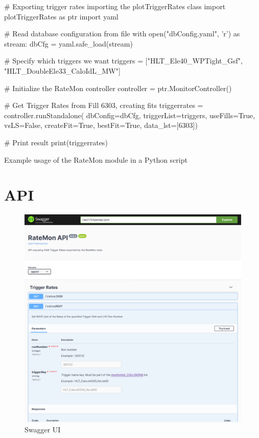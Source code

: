 \begin{listing}[ht]
\begin{pythoncode}
# Exporting trigger rates importing the plotTriggerRates class
import plotTriggerRates as ptr
import yaml

# Read database configuration from file
with open("dbConfig.yaml", 'r') as stream:
    dbCfg = yaml.safe_load(stream)

# Specify which triggers we want
triggers = ["HLT_Ele40_WPTight_Gsf",
              "HLT_DoubleEle33_CaloIdL_MW"]

# Initialize the RateMon controller
controller = ptr.MonitorController()

# Get Trigger Rates from Fill 6303, creating fits
triggerrates = controller.runStandalone(
                         dbConfig=dbCfg,
                         triggerList=triggers,
                         useFills=True,
                         vsLS=False,
                         createFit=True,
                         bestFit=True,
                         data_lst=[6303])

# Print result
print(triggerrates)
\end{pythoncode}
\caption{Example usage of the RateMon module in a Python script}
\end{listing}

\section{API}

\begin{figure}
    \centerline{
        \includegraphics[width=0.8\paperwidth]{figures/swagger-ui}}
    \caption{Swagger UI}
    \label{fig:swagger-ui}
\end{figure}

